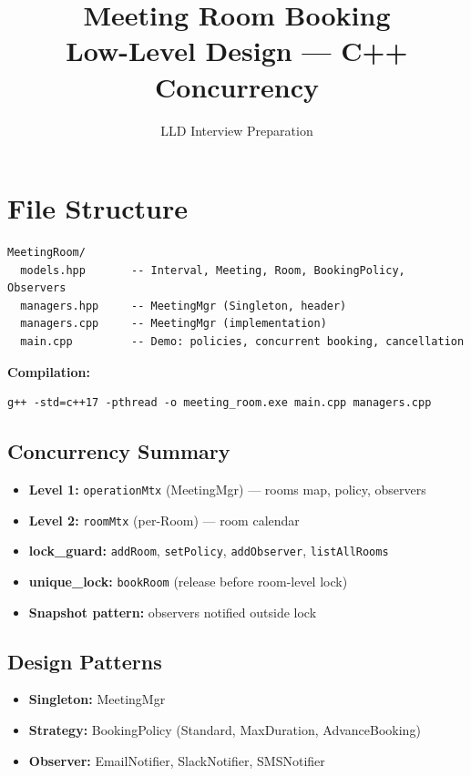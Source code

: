 \documentclass[11pt,a4paper]{article}
\title{\Huge\textbf{Meeting Room Booking}\\[0.3em]\Large Low-Level Design --- C++ Concurrency}
\author{LLD Interview Preparation}
\date{}
\begin{document}
\maketitle
\tableofcontents
\newpage

\section{File Structure}
\begin{verbatim}
MeetingRoom/
  models.hpp       -- Interval, Meeting, Room, BookingPolicy, Observers
  managers.hpp     -- MeetingMgr (Singleton, header)
  managers.cpp     -- MeetingMgr (implementation)
  main.cpp         -- Demo: policies, concurrent booking, cancellation
\end{verbatim}

\textbf{Compilation:}
\begin{verbatim}
g++ -std=c++17 -pthread -o meeting_room.exe main.cpp managers.cpp
\end{verbatim}

\subsection{Concurrency Summary}
\begin{itemize}
    \item \textbf{Level 1:} \texttt{operationMtx} (MeetingMgr) --- rooms map, policy, observers
    \item \textbf{Level 2:} \texttt{roomMtx} (per-Room) --- room calendar
    \item \textbf{lock\_guard:} \texttt{addRoom}, \texttt{setPolicy}, \texttt{addObserver}, \texttt{listAllRooms}
    \item \textbf{unique\_lock:} \texttt{bookRoom} (release before room-level lock)
    \item \textbf{Snapshot pattern:} observers notified outside lock
\end{itemize}

\subsection{Design Patterns}
\begin{itemize}
    \item \textbf{Singleton:} MeetingMgr
    \item \textbf{Strategy:} BookingPolicy (Standard, MaxDuration, AdvanceBooking)
    \item \textbf{Observer:} EmailNotifier, SlackNotifier, SMSNotifier
\end{itemize}
\end{document}
